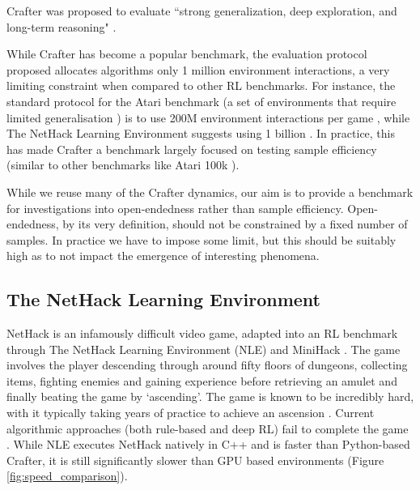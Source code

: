 \documentclass{article}
\theoremstyle{plain}
\theoremstyle{definition}
\theoremstyle{remark}
\begin{document}
Crafter was proposed to evaluate ``strong generalization, deep
exploration, and long-term reasoning" \citep{hafner2021benchmarking}.


While Crafter has become a popular benchmark, the evaluation protocol proposed allocates algorithms only 1 million environment interactions, a very limiting constraint when compared to other RL benchmarks.  For instance, the standard protocol for the Atari benchmark (a set of environments that require limited generalisation \citep{cobbe2020leveraging}) is to use 200M environment interactions per game \citep{machado2018revisiting}, while The NetHack Learning Environment suggests using 1 billion \citep{nle2020kuttler}.  In practice, this has made Crafter a benchmark largely focused on testing sample efficiency (similar to other benchmarks like Atari 100k \citep{bellemare2013arcade}).  

While we reuse many of the Crafter dynamics, our aim is to provide a benchmark for investigations into open-endedness rather than sample efficiency. Open-endedness, by its very definition, should not be constrained by a fixed number of samples.  In practice we have to impose some limit, but this should be suitably high as to not impact the emergence of interesting phenomena.


\subsection{The NetHack Learning Environment} \label{sec:background_nle}

NetHack is an infamously difficult video game, adapted into an RL benchmark through The NetHack Learning Environment (NLE) \citep{nle2020kuttler} and MiniHack \citep{minihack2021samvelyan}.  The game involves the player descending through around fifty floors of dungeons, collecting items, fighting enemies and gaining experience before retrieving an amulet and finally beating the game by `ascending'.  The game is known to be incredibly hard, with it typically taking years of practice to achieve an ascension \citep{nle2020kuttler}. Current algorithmic approaches (both rule-based and deep RL) fail to complete the game \citep{nethackchallenge2022hambro}.
While NLE executes NetHack natively in C++ and is faster than Python-based Crafter, it is still significantly slower than GPU based environments (Figure \ref{fig:speed_comparison}).
\end{document}
